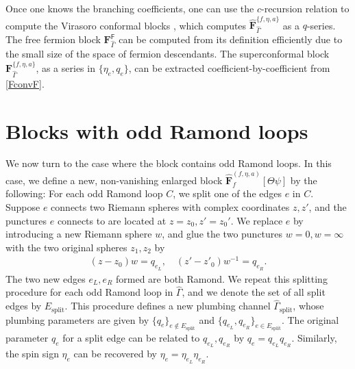 \documentclass[aps,10pt,twocolumn,superscriptaddress]{revtex4-2}
\def\ie{\begin{equation}\begin{aligned}}
\def\fe{\end{aligned}\end{equation}}
\begin{document}
Once one knows the branching coefficients, one can use the $c$-recursion relation to compute the Virasoro conformal blocks \cite{Cho:2017oxl}, which computes $\widehat{\mathbf{F}}_{\hat{\Gamma}}^{\{f, \eta, a\}}$ as a $q$-series. The free fermion block $\mathbf{F}^{\mathsf{F}}_{\hat{\Gamma}}$ can be computed from its definition efficiently due to the small size of the space of fermion descendants. The superconformal block $\mathbf{F}_{\hat{\Gamma}}^{\{f, \eta, a\}}$, as a series in $\{\eta_e, q_e\}$, can be extracted coefficient-by-coefficient from \eqref{FconvF}.

\section{Blocks with odd Ramond loops}

\label{sec:oddloop}

We now turn to the case where the block contains odd Ramond loops. In this case, we define a new, non-vanishing enlarged block $\hat{\mathbf{F}}^{(f,\eta,a)}_f[\Theta\psi]$ by the following: For each odd Ramond loop $C$, we split one of the edges $e$ in $C$. Suppose $e$ connects two Riemann spheres with complex coordinates $z, z'$, and the punctures $e$ connects to are located at $z=z_0, z'=z_0'$. We replace $e$ by introducing a new Riemann sphere $w$, and glue the two punctures $w=0, w=\infty$ with the two original spheres $z_1, z_2$ by
\ie 
(z-z_0)w={q}_{e_L},\quad (z'-z'_0)w^{-1}=q_{e_R}.
\fe
The two new edges $e_L, e_R$ formed are both Ramond. We repeat this splitting procedure for each odd Ramond loop in $\hat{\Gamma}$, and we denote the set of all split edges by $E_\mathrm{split}$. This procedure defines a new plumbing channel $\hat{\Gamma}_{\mathrm{split}}$, whose plumbing parameters are given by $\{q_e\}_{e\notin E_\mathrm{split}}$ and $\{q_{e_L}, q_{e_R}\}_{e\in E_\mathrm{split}}$. The original parameter $q_e$ for a split edge can be related to $q_{e_L}, q_{e_R}$ by $q_e=q_{e_L}q_{e_R}$. Similarly, the spin sign $\eta_e$ can be recovered by $\eta_e=\eta_{e_L}\eta_{e_R}$.
\end{document}
